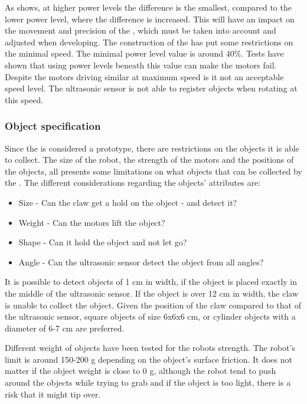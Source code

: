 As  shows, at higher power levels the difference is the smallest, compared to the lower power level, where the difference is increased. This will have an impact on the movement and precision of the \projname{}, which must be taken into account and adjusted when developing. The construction of the \projname{} has put some restrictions on the minimal speed. The minimal power level value is around 40\%. Tests have shown that using power levels beneath this value can make the motors fail. Despite the motors driving similar at maximum speed is it not an acceptable speed level. The ultrasonic sensor is not able to register objects when rotating at this speed.

\subsubsection{Object specification} \label{sec:object_specification}
Since the \projname{} is considered a prototype, there are restrictions on the objects it is able to collect. The size of the robot, the strength of the motors and the positions of the objects, all presents some limitations on what objects that can be collected by the \projname{}. The different considerations regarding the objects' attributes are:

\begin{itemize}
\item Size - Can the claw get a hold on the object - and detect it? 
\item Weight - Can the motors lift the object? 
\item Shape - Can it hold the object and not let go?
\item Angle - Can the ultrasonic sensor detect the object from all angles?
\end{itemize}

It is possible to detect objects of 1 cm in width, if the object is placed exactly in the middle of the ultrasonic sensor. If the object is over 12 cm in width, the claw is unable to collect the object. Given the position of the claw compared to that of the ultrasonic sensor, square objects of size 6x6x6 cm, or cylinder objects with a diameter of 6-7 cm are preferred.

Different weight of objects have been tested for the robots strength. The robot's limit is around 150-200 g depending on the object's surface friction. It does not matter if the object weight is close to 0 g, although the robot tend to push around the objects while trying to grab and if the object is too light, there is a risk that it might tip over.

